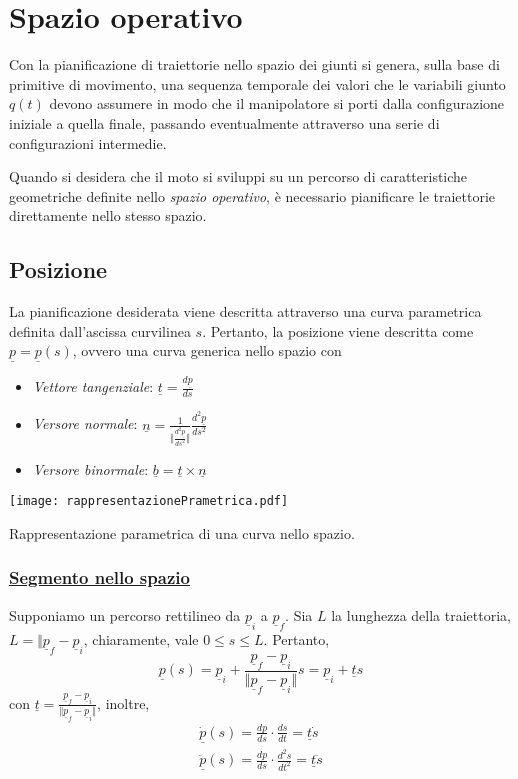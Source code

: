 \section{Spazio operativo}
Con la pianificazione di traiettorie nello spazio dei giunti si genera, sulla base di primitive di movimento, una sequenza temporale dei valori che le variabili giunto $q(t)$ devono assumere in modo che il manipolatore si porti dalla configurazione iniziale a quella finale, passando eventualmente attraverso una serie di configurazioni intermedie.

Quando si desidera che il moto si sviluppi su un percorso di caratteristiche geometriche definite nello \emph{spazio operativo}, è necessario pianificare le traiettorie direttamente nello stesso spazio. 

\subsection{Posizione}
La pianificazione desiderata viene descritta attraverso una curva parametrica definita dall'ascissa curvilinea $s$. Pertanto, la posizione viene descritta come $\underline{p}=\underline{p}(s)$, ovvero una curva generica nello spazio con
\begin{itemize}
	\item \emph{Vettore tangenziale}: $\underline{t} = \frac{d \underline{p}}{ds}$
	\item \emph{Versore normale}: $\underline{n} = \frac{1}{\Vert \frac{d^2 \underline{p}}{d s^2} \Vert } \frac{d^2 \underline{p}}{ds^2}$
	\item \emph{Versore binormale}: $\underline{b} = \underline{t} \times \underline{n}$
\end{itemize}

\begin{center}
	\texttt{[image: rappresentazionePrametrica.pdf]}
	\caption{Rappresentazione parametrica di una curva nello spazio.}
\end{center}

\subsubsection{\underline{Segmento nello spazio}}
Supponiamo un percorso rettilineo da $\underline{p}_i$ a $\underline{p}_f$. Sia $L$ la lunghezza della traiettoria, $L = \Vert \underline{p}_f - \underline{p}_i$, chiaramente, vale $0 \leqslant s \leqslant L$. Pertanto,
\begin{equation}
	\underline{p}(s) = \underline{p}_i + \frac{\underline{p}_f - \underline{p}_i}{\Vert \underline{p}_f - \underline{p}_i \Vert} s = \underline{p}_i + \underline{t}s
\end{equation} 
con $\underline{t} = \frac{\underline{p}_f - \underline{p}_i}{\Vert \underline{p}_f - \underline{p}_i \Vert}$, inoltre,
\begin{align}
	\dot{\underline{p}}(s) = \frac{d p}{ds} \cdot \frac{ds}{dt} = \underline{t} \dot{s} \\
	\ddot{\underline{p}}(s) = \frac{d p}{ds} \cdot \frac{d^2s}{dt^2} = \underline{t} \ddot{s}
\end{align}

